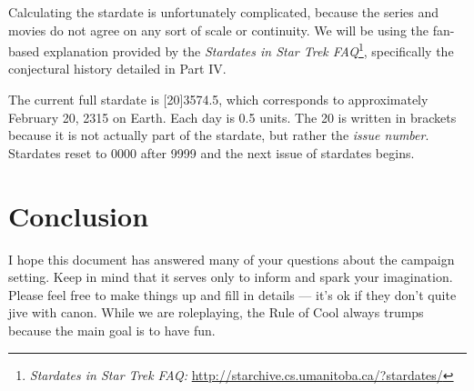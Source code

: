 \documentclass[12pt]{article}
\begin{document}
Calculating the stardate is unfortunately complicated, because the series and
movies do not agree on any sort of scale or continuity. We will be using the
fan-based explanation provided by the \emph{Stardates in Star Trek
FAQ}\footnote{\emph{Stardates in Star Trek FAQ:}
\url{http://starchive.cs.umanitoba.ca/?stardates/}}, specifically the
conjectural history detailed in Part IV.

The current full stardate is [20]3574.5, which corresponds to approximately
February 20, 2315 on Earth. Each day is 0.5 units. The 20 is written in
brackets because it is not actually part of the stardate, but rather the
\emph{issue number}. Stardates reset to 0000 after 9999 and the next issue of
stardates begins.

\section{Conclusion}

I hope this document has answered many of your questions about the campaign
setting. Keep in mind that it serves only to inform and spark your imagination.
Please feel free to make things up and fill in details --- it's ok if they
don't quite jive with canon. While we are roleplaying, the Rule of Cool always
trumps because the main goal is to have fun.
\end{document}
